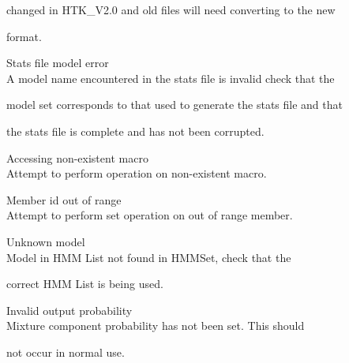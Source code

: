 \begin{itemize}
\begin{itemize}
        changed in HTK\_V2.0 and old files will need converting to the new


        format.





    Stats file model error\\


        A model name encountered in the stats file is invalid check that the


        model set corresponds to that used to generate the stats file and that


        the stats file is complete and has not been corrupted.





    Accessing non-existent macro\\


        Attempt to perform operation on non-existent macro.





    Member id out of range\\


        Attempt to perform set operation on out of range member.





\end{itemize}










\begin{itemize}





    Unknown model\\


        Model in HMM List not found in HMMSet, check that the


        correct HMM List is being used.





    Invalid output probability\\


        Mixture component probability has not been set.  This should


        not occur in normal use.






\end{itemize}
\end{itemize}
